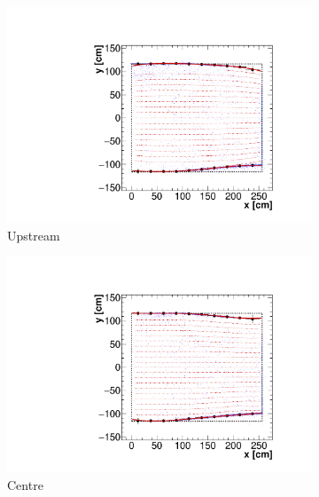 \documentclass[11pt]{article}
\begin{document}
\begin{description}[style=nextline]
  \begin{figure}[htbp]
  \begin{center}
    \begin{subfigure}{0.32\textwidth}
      \includegraphics[width=\linewidth]{../figures/upstream_sce.pdf}
      \caption{Upstream}
    \end{subfigure}
    \begin{subfigure}{0.32\textwidth}
      \includegraphics[width=\linewidth]{../figures/centre_sce.pdf}
      \caption{Centre}
    \end{subfigure}
    \begin{subfigure}{0.32\textwidth}

\end{subfigure}
\end{center}
\end{figure}
\end{description}
\end{document}
